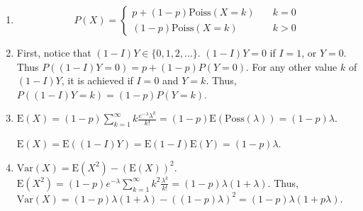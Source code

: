 \begin{enumerate}[label=(\alph*)]
\item
\begin{equation*}
P(X) = 
    \left\{
        \begin{array}{ll}
            p + (1-p)\text{Poiss}(X = k) & \quad k = 0 \\
            (1-p)\text{Poiss}(X = k) & \quad k > 0
        \end{array}
    \right.
\end{equation*}

\item First, notice that $(1-I)Y \in \{0,1,2,\dots\}$. $(1-I)Y = 0$ if $I=1$, or
$Y=0$. Thus $P((1-I)Y = 0) = p + (1-p)P(Y=0)$. For any other value $k$ of $
(1-I)Y$, it is achieved if $I = 0$ and $Y = k$. Thus, $P((1-I)Y = k) = (1-p)P(Y
= k)$.
\item $\text{E}(X) = (1-p)\sum_{k=1}^{\infty}k\frac{e^{-\lambda}\lambda^{k}}{k!}
= (1-p)\text{E}(\text{Poss}(\lambda)) = (1-p)\lambda$.

$\text{E}(X) = \text{E}((1-I)Y) = \text{E}(1-I)\text{E}(Y) = (1-p)\lambda$.

\item $\text{Var}(X) = \text{E}(X^{2}) - (\text{E}(X))^{2}$. $\text{E}(X^{2}) =
(1-p)e^{-\lambda}\sum_{k=1}^{\infty}k^{2}\frac{\lambda^{k}}{k!} = (1-p)\lambda
(1+\lambda)$. Thus, $\text{Var}(X) = (1-p)\lambda(1+\lambda) - ((1-p)\lambda)^
{2} = (1-p)\lambda(1 + p\lambda)$.
\end{enumerate}